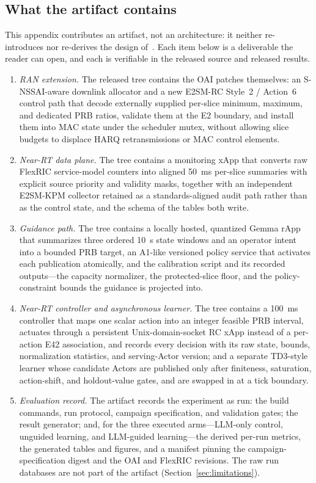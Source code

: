 \subsection{What the artifact contains}
This appendix contributes an artifact, not an architecture: it neither re-introduces nor re-derives the \systemname{} design of~\cite{bao2026llmhric}. Each item below is a deliverable the reader can open, and each is verifiable in the released source and released results.
\begin{enumerate}
  \item \emph{RAN extension.} The released tree contains the OAI patches themselves: an S-NSSAI-aware downlink allocator and a new E2SM-RC Style~2 / Action~6 control path that decode externally supplied per-slice minimum, maximum, and dedicated PRB ratios, validate them at the E2 boundary, and install them into MAC state under the scheduler mutex, without allowing slice budgets to displace HARQ retransmissions or MAC control elements.
  \item \emph{Near-RT data plane.} The tree contains a monitoring xApp that converts raw FlexRIC service-model counters into aligned 50~ms per-slice summaries with explicit source priority and validity masks, together with an independent E2SM-KPM collector retained as a standards-aligned audit path rather than as the control state, and the schema of the tables both write.
  \item \emph{Guidance path.} The tree contains a locally hosted, quantized Gemma rApp that summarizes three ordered 10~s state windows and an operator intent into a bounded PRB target, an A1-like versioned policy service that activates each publication atomically, and the calibration script and its recorded outputs---the capacity normalizer, the protected-slice floor, and the policy-constraint bounds the guidance is projected into.
  \item \emph{Near-RT controller and asynchronous learner.} The tree contains a 100~ms controller that maps one scalar action into an integer feasible PRB interval, actuates through a persistent Unix-domain-socket RC xApp instead of a per-action E42 association, and records every decision with its raw state, bounds, normalization statistics, and serving-Actor version; and a separate TD3-style learner whose candidate Actors are published only after finiteness, saturation, action-shift, and holdout-value gates, and are swapped in at a tick boundary.
  \item \emph{Evaluation record.} The artifact records the experiment as run: the build commands, run protocol, campaign specification, and validation gates; the result generator; and, for the three executed arms---LLM-only control, unguided learning, and LLM-guided learning---the derived per-run metrics, the generated tables and figures, and a manifest pinning the campaign-specification digest and the OAI and FlexRIC revisions. The raw run databases are not part of the artifact (Section~\ref{sec:limitations}).
\end{enumerate}

